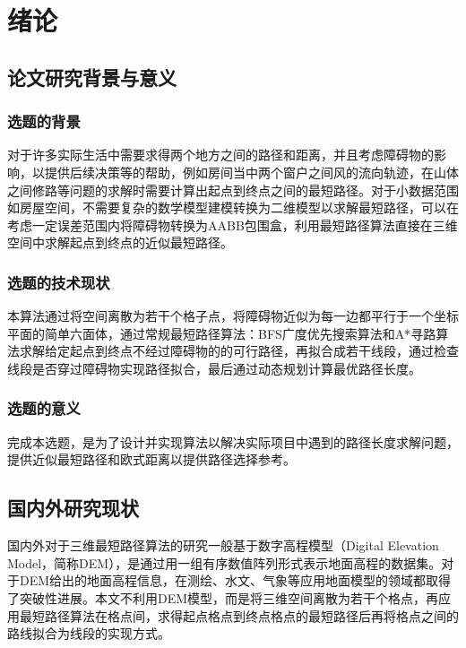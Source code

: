 \chapter{绪论}
 
 \section{论文研究背景与意义}
\subsection{选题的背景}
对于许多实际生活中需要求得两个地方之间的路径和距离，并且考虑障碍物的影响，以提供后续决策等的帮助，例如房间当中两个窗户之间风的流向轨迹，在山体之间修路等问题的求解时需要计算出起点到终点之间的最短路径。对于小数据范围如房屋空间，不需要复杂的数学模型建模转换为二维模型以求解最短路径，可以在考虑一定误差范围内将障碍物转换为AABB包围盒，利用最短路径算法直接在三维空间中求解起点到终点的近似最短路径。
\subsection{选题的技术现状}
本算法通过将空间离散为若干个格子点，将障碍物近似为每一边都平行于一个坐标平面的简单六面体，通过常规最短路径算法：BFS广度优先搜索算法和A*寻路算法求解给定起点到终点不经过障碍物的的可行路径，再拟合成若干线段，通过检查线段是否穿过障碍物实现路径拟合，最后通过动态规划计算最优路径长度。
\subsection{选题的意义}
完成本选题，是为了设计并实现算法以解决实际项目中遇到的路径长度求解问题，提供近似最短路径和欧式距离以提供路径选择参考。
\section{国内外研究现状}
国内外对于三维最短路径算法的研究一般基于数字高程模型（Digital Elevation Model，简称DEM），是通过用一组有序数值阵列形式表示地面高程的数据集。对于DEM给出的地面高程信息，在测绘、水文、气象等应用地面模型的领域都取得了突破性进展。本文不利用DEM模型，而是将三维空间离散为若干个格点，再应用最短路径算法在格点间，求得起点格点到终点格点的最短路径后再将格点之间的路线拟合为线段的实现方式。
